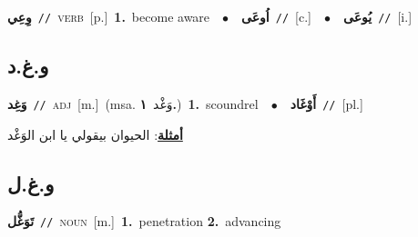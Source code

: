 \documentclass[10pt,a4paper,twoside]{article} %
\begin{document}
\begin{multicols}{2}
{\setlength\topsep{0pt}\textbf{\foreignlanguage{arabic}{وِعِي}}\ {\color{gray}\texttt{//}\color{black}}\ \textsc{verb}\ [p.]\ \textbf{1.}~become aware\ \ $\bullet$\ \ \setlength\topsep{0pt}\textbf{\foreignlanguage{arabic}{اُوعَى}}\ {\color{gray}\texttt{//}\color{black}}\ [c.]\ \ $\bullet$\ \ \setlength\topsep{0pt}\textbf{\foreignlanguage{arabic}{يُوعَى}}\ {\color{gray}\texttt{//}\color{black}}\ [i.]\ } \vspace{2mm}

\vspace{-3mm}
\subsection*{\color{blue}\foreignlanguage{arabic}{و.غ.د}\color{blue}{}} 

{\setlength\topsep{0pt}\textbf{\foreignlanguage{arabic}{وَغِد}}\ {\color{gray}\texttt{//}\color{black}}\ \textsc{adj}\ [m.]\ \color{gray}(msa. \foreignlanguage{arabic}{وَغْد}~\foreignlanguage{arabic}{\textbf{١.}})\color{black}\ \textbf{1.}~scoundrel\ \ $\bullet$\ \ \setlength\topsep{0pt}\textbf{\foreignlanguage{arabic}{أَوْغَاد}}\ {\color{gray}\texttt{//}\color{black}}\ [pl.]\  \begin{flushright}\color{gray}\foreignlanguage{arabic}{\textbf{\underline{\foreignlanguage{arabic}{أمثلة}}}: الحيوان بيقولي يا ابن الوَغْد}\end{flushright}\color{black}} \vspace{2mm}

\vspace{-3mm}
\subsection*{\color{blue}\foreignlanguage{arabic}{و.غ.ل}\color{blue}{}} 

{\setlength\topsep{0pt}\textbf{\foreignlanguage{arabic}{تَوَغُّل}}\ {\color{gray}\texttt{//}\color{black}}\ \textsc{noun}\ [m.]\ \textbf{1.}~penetration  \textbf{2.}~advancing\ } \vspace{2mm}


\end{multicols}
\end{document}
